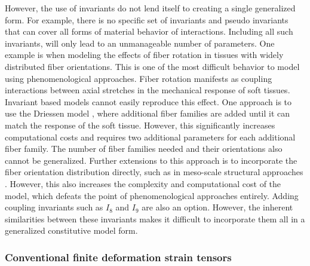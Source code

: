 	However, the use of invariants do not lend itself to creating a single generalized form. For example, there is no specific set of invariants and pseudo invariants that can cover all forms of material behavior of interactions. Including all such invariants, will only lead to an unmanageable number of parameters. One example is when modeling the effects of fiber rotation in tissues with widely distributed fiber orientations. This is one of the most difficult behavior to model using phenomenological approaches. Fiber rotation manifests as coupling interactions between axial stretches in the mechanical response of soft tissues. Invariant based models cannot easily reproduce this effect. One approach is to use the Driessen model \cite{driessen_structural_2005}, where additional fiber families are added until it can match the response of the soft tissue. However, this significantly increases computational costs and requires two additional parameters for each additional fiber family. The number of fiber families needed and their orientations also cannot be generalized. Further extensions to this approach is to incorporate the fiber orientation distribution directly, such as in meso-scale structural approaches \cite{sacks_incorporation_2003a, fata_insights_2014, zhang_meso_2016}. However, this also increases the complexity and computational cost of the model, which defeats the point of phenomenological approaches entirely. Adding coupling invariants such as $I_8$ and $I_9$ are also an option. However, the inherent similarities between these invariants makes it difficult to incorporate them all in a generalized constitutive model form. 
    
    
    
\subsubsection{Conventional finite deformation strain tensors} \label{sec:straintensor}

